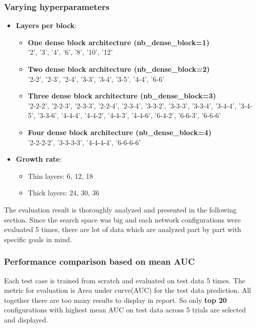 \subsubsection{Varying hyperparameters}
\begin{itemize}
 \item \textbf{Layers per block}:
 \begin{itemize}
  \item \textbf{One dense block architecture (nb\_dense\_block=1)}\\
  '2', '3', '4', '6', '8', '10', '12'
  \item \textbf{Two dense block architecture (nb\_dense\_block=2)}\\
  '2-2', '2-3', '2-4', '3-3', '3-4', '3-5', '4-4', '6-6'
  \item \textbf{Three dense block architecture (nb\_dense\_block=3)}\\
  '2-2-2', '2-2-3', '2-3-3', '2-2-4', '2-3-4', '3-3-2', '3-3-3', '3-3-4', '3-4-4', '3-4-5', '3-3-6', '4-4-4', '4-4-2', '4-4-3', '4-4-6', '6-4-2', '6-6-3', '6-6-6'
  \item \textbf{Four dense block architecture (nb\_dense\_block=4)}\\
  '2-2-2-2', '3-3-3-3', '4-4-4-4', '6-6-6-6'
 \end{itemize}
 \item \textbf{Growth rate}:
  \begin{itemize}
  \item Thin layers: 6, 12, 18
  \item Thick layers: 24, 30, 36
 \end{itemize}
 
\end{itemize}

The evaluation result is thoroughly analyzed and presented in the following section. Since the search space was big and each network configurations were evaluated 5 times, there are lot of data which are analyzed part by part
with specific goals in mind.

\subsubsection{Performance comparison based on mean AUC}
Each test case is trained from scratch and evaluated on test data 5 times. The metric for evaluation is Area under curve(AUC) for the test data prediction. All together there are too many results to display in report. 
So only \textbf{top 20} configurations with highest mean AUC on test data across 5 trials are selected and displayed.  

